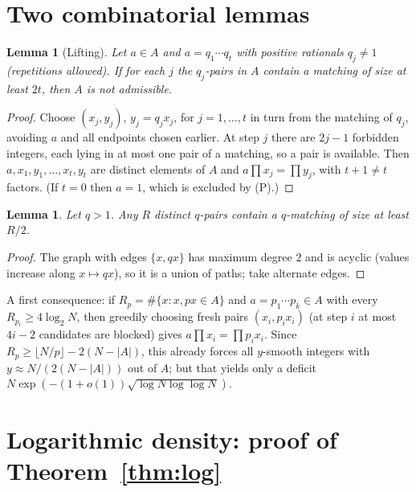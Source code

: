 \documentclass[11pt]{amsart}
\newtheorem{lemma}[theorem]{Lemma}
\theoremstyle{definition}
\theoremstyle{remark}
\newcommand{\abs}[1]{\lvert #1\rvert}
\newcommand{\floor}[1]{\lfloor #1\rfloor}
\begin{document}
\section{Two combinatorial lemmas}

\begin{lemma}[Lifting]\label{lem:lift}
Let $a\in A$ and $a=q_1\cdots q_t$ with positive rationals $q_j\ne1$ (repetitions allowed). If for each $j$ the $q_j$-pairs in $A$ contain a matching of size at least $2t$, then $A$ is not admissible.
\end{lemma}
\begin{proof}
Choose $(x_j,y_j)$, $y_j=q_jx_j$, for $j=1,\dots,t$ in turn from the matching of $q_j$, avoiding $a$ and all endpoints chosen earlier. At step $j$ there are $2j-1$ forbidden integers, each lying in at most one pair of a matching, so a pair is available. Then $a,x_1,y_1,\dots,x_t,y_t$ are distinct elements of $A$ and $a\prod x_j=\prod y_j$, with $t+1\ne t$ factors. (If $t=0$ then $a=1$, which is excluded by (P).)
\end{proof}

\begin{lemma}\label{lem:paths}
Let $q>1$. Any $R$ distinct $q$-pairs contain a $q$-matching of size at least $R/2$.
\end{lemma}
\begin{proof}
The graph with edges $\{x,qx\}$ has maximum degree $2$ and is acyclic (values increase along $x\mapsto qx$), so it is a union of paths; take alternate edges.
\end{proof}

A first consequence: if $R_p=\#\{x:x,px\in A\}$ and $a=p_1\cdots p_k\in A$ with every $R_{p_i}\ge4\log_2N$, then greedily choosing fresh pairs $(x_i,p_ix_i)$ (at step $i$ at most $4i-2$ candidates are blocked) gives $a\prod x_i=\prod p_ix_i$. Since $R_p\ge\floor{N/p}-2(N-\abs A)$, this already forces all $y$-smooth integers with $y\approx N/(2(N-\abs{A}))$ out of $A$; but that yields only a deficit $N\exp(-(1+o(1))\sqrt{\log N\log\log N})$.

\section{Logarithmic density: proof of Theorem~\ref{thm:log}}
\end{document}
